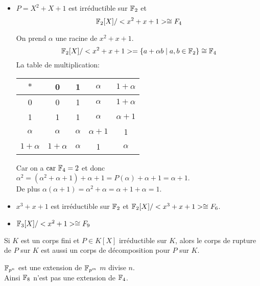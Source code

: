 \begin{example}

	\begin{itemize}
		\item $P = X^2+X+1$ est irréductible sur $\mathbb{F}_2$ et
		      $$\mathbb{F}_2[X]/ <x^2+x+1> \cong F_4$$

		      On prend $\alpha$ une racine de $x^2+x+1$.
		      $$\mathbb{F}_2[X]/ <x^2+x+1> = \left\{ a + \alpha b \mid a,b \in \mathbb{F}_2\right\} \cong \mathbb{F}_4$$
		      La table de multiplication:

		      \begin{center}
			      \begin{tabular}{c|c|c|c|c}
				      $*$        & 0          & 1        & $\alpha$    & $1+\alpha$  \\
				      \hline
				      0          & 0          & 1        & $\alpha$    & $1+\alpha$  \\
				      \hline
				      1          & 1          & 1        & $\alpha$    & $\alpha +1$ \\
				      \hline
				      $\alpha$   & $\alpha$   & $\alpha$ & $\alpha +1$ & 1           \\
				      \hline
				      $1+\alpha$ & $1+\alpha$ & $\alpha$ & 1           & $\alpha$    \\
			      \end{tabular}
		      \end{center}

		      Car on a $\text{car} \ \mathbb{F}_4 = 2$ et donc $\alpha^2 = (\alpha^2 + \alpha + 1 ) + \alpha + 1 =  P(\alpha) + \alpha + 1 = \alpha + 1$. \\
		      De plus $\alpha(\alpha + 1) = \alpha^2 + \alpha = \alpha + 1 + \alpha = 1$.
		\item$x^3+x+1$ est irréductible sur $\mathbb{F}_2$ et $\mathbb{F}_2[X]/ <x^3+x+1> \cong F_6$.
		\item$ \mathbb{F}_3[X]/ <x^2+1> \cong F_9$
	\end{itemize}
\end{example}


\begin{exercice}
	Si $K$ est un corps fini et $P \in K[X]$ irréductible sur $K$, alors le
	corps de rupture de $P$ sur $K$ est aussi un corps de décomposition pour $P$ sur $K$.
\end{exercice}

\begin{remarque}
	$\mathbb{F}_{p^n}$ est une extension de $\mathbb{F}_{p^m}$ \ssi $m$ divise $n$.\\
	Ainsi $\mathbb{F}_8$ n'est pas une extension de $\mathbb{F}_4$. \\
\end{remarque}

